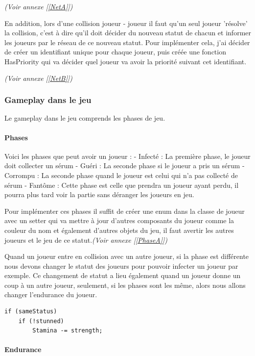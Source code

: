 \documentclass{article}
\begin{document}
\emph{(Voir annexe [\ref{NetA}])}


En addition, lors d'une collision joueur - joueur il faut qu'un seul joueur 'résolve' la collision, c'est à dire qu'il doit décider du nouveau statut de chacun et informer les joueurs par le réseau de ce nouveau statut.
Pour implémenter cela, j'ai décider de créer un identifiant unique pour chaque joueur, puis créée une fonction HasPriority qui va décider quel joueur va avoir la priorité suivant cet identifiant.

\emph{(Voir annexe [\ref{NetB}])}

\newpage
\subsubsection{Gameplay dans le jeu}

Le gameplay dans le jeu comprends les phases de jeu.

\paragraph{Phases}

Voici les phases que peut avoir un joueur :
- Infecté : La première phase, le joueur doit collecter un sérum
- Guéri : La seconde phase si le joueur a pris un sérum
- Corrompu : La seconde phase quand le joueur est celui qui n'a pas collecté de sérum
- Fantôme : Cette phase est celle que prendra un joueur ayant perdu, il pourra plus tard voir la partie sans déranger les joueurs en jeu.

Pour implémenter ces phases il suffit de créer une enum dans la classe de joueur avec un setter qui va mettre à jour d'autres composants du joueur comme la couleur du nom et également d'autres objets du jeu, il faut avertir les autres joueurs et le jeu de ce statut.\emph{(Voir annexe [\ref{PhaseA}])}

Quand un joueur entre en collision avec un autre joueur, si la phase est différente nous devons changer le statut des joueurs pour pouvoir infecter un joueur par exemple. Ce changement de statut a lieu également quand un joueur donne un coup à un autre joueur, seulement, si les phases sont les même, alors nous allons changer l'endurance du joueur.

\begin{lstlisting}
if (sameStatus)
    if (!stunned)
        Stamina -= strength;
\end{lstlisting}

\paragraph{Endurance}
\end{document}
